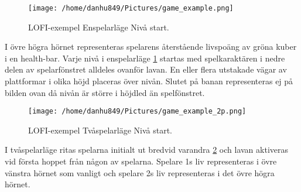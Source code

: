 \documentclass{TDP005mall}
\begin{document}
\begin{figure}[h!]
  \caption{LOFI-exempel Enspelarläge Nivå start.\label{fig:7}}
  \centerline{\texttt{[image: /home/danhu849/Pictures/game\_example.png]}}  
\end{figure}

I övre högra hörnet representeras spelarens återstående livspoäng av gröna kuber i en health-bar. Varje nivå i enspelarläge \ref{fig:7} startas med spelkaraktären i nedre delen av spelarfönstret alldeles ovanför lavan. En eller flera utstakade vägar av plattformar i olika höjd placeras över nivån. Slutet på banan representeras ej på bilden ovan då nivån är större i höjdled än spelfönstret.

\newpage
\begin{figure}[h!]
  \caption{LOFI-exempel Tvåspelarläge Nivå start.\label{fig:8}}
  \centerline{\texttt{[image: /home/danhu849/Pictures/game\_example\_2p.png]}}  
\end{figure}
I tvåspelarläge ritas spelarna initialt ut bredvid varandra \ref{fig:8} och lavan aktiveras vid första hoppet från någon av spelarna. Spelare 1s liv representeras i övre vänstra hörnet som vanligt och spelare 2s liv representeras i det övre högra hörnet.
\end{document}
